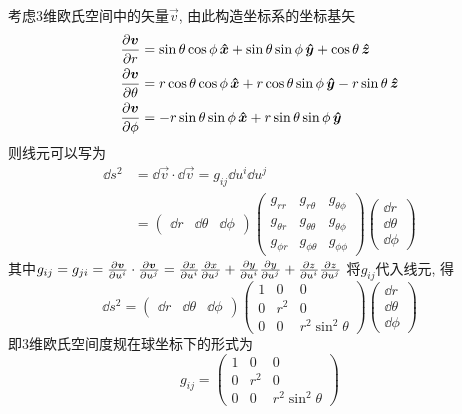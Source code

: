 \begin{solution}
    考虑$3$维欧氏空间中的矢量$\vec{v}$, 由此构造坐标系的坐标基矢
    \[
        \begin{aligned}
            \frac{\partial \boldsymbol{v}}{\partial r} &= \sin\theta \cos\phi \,\boldsymbol{\hat{x}} + \sin\theta \sin\phi \,\boldsymbol{\hat{y}} + \cos\theta \,\boldsymbol{\hat{z}} \\
            \frac{\partial \boldsymbol{v}}{\partial \theta} &= r \cos\theta \cos\phi \,\boldsymbol{\hat{x}} + r \cos\theta \sin\phi \,\boldsymbol{\hat{y}} - r \sin\theta \,\boldsymbol{\hat{z}} \\
            \frac{\partial \boldsymbol{v}}{\partial \phi} &= -r \sin\theta \sin\phi \,\boldsymbol{\hat{x}} + r \sin\theta \sin\phi \,\boldsymbol{\hat{y}}
        \end{aligned}
    \]
    则线元可以写为
    \[
    \begin{aligned}
        \dd s^2 &= \dd \vec{v} \cdot \dd \vec{v} = g_{ij} \dd u^i \dd u^j\\
        &= \begin{pmatrix}
            \dd r & \dd \theta & \dd \phi
        \end{pmatrix} \begin{pmatrix}
            g_{rr} & g_{r\theta} & g_{\theta\phi} \\
            g_{\theta r} & g_{\theta\theta} & g_{\theta\phi} \\
            g_{\phi r} & g_{\phi\theta} & g_{\phi\phi}
        \end{pmatrix} \begin{pmatrix}
            \dd r \\ \dd \theta \\ \dd \phi
        \end{pmatrix}
    \end{aligned}
    \]
    其中$g_{ij} = g_{ji} = \frac{\partial \boldsymbol{v}}{\partial u^i} \cdot \frac{\partial \boldsymbol{v}}{\partial u^j} =
    \frac{\partial x}{\partial u^i} \frac{\partial x}{\partial u^j} + \frac{\partial y}{\partial u^i}
    \frac{\partial y}{\partial u^j} + \frac{\partial z}{\partial u^i} \frac{\partial z}{\partial u^j}$
    将$g_{ij}$代入线元, 得
    \[
        \dd s^2 = \begin{pmatrix}
            \dd r & \dd \theta & \dd \phi
        \end{pmatrix} \begin{pmatrix}
            1 & 0 & 0 \\
            0 & r^2 & 0 \\
            0 & 0 & r^2 \sin^2\theta
        \end{pmatrix} \begin{pmatrix}
            \dd r \\ \dd \theta \\ \dd \phi
        \end{pmatrix}
    \]
    即$3$维欧氏空间度规在球坐标下的形式为
    \[
        g_{ij} = \begin{pmatrix}
            1 & 0 & 0 \\
            0 & r^2 & 0 \\
            0 & 0 & r^2 \sin^2\theta
        \end{pmatrix}
    \]
\end{solution}
